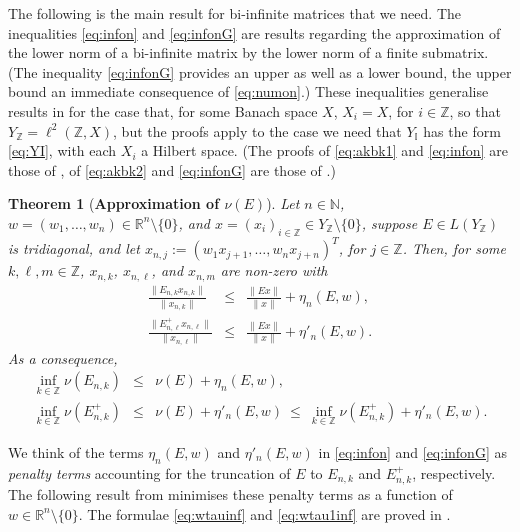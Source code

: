\documentclass[preprint,1p,11pt]{elsarticle}
\newcommand\N{{\mathbb N}}
\newcommand\I{{\mathbb I}}
\newcommand\R{{\mathbb R}}
\newcommand\Z{{\mathbb Z}}
\newtheorem{theorem}{Theorem}[section]
\numberwithin{equation}{section}   %
\numberwithin{figure}{section}  %
\begin{document}
The following is the main result for bi-infinite matrices that we need. The inequalities \eqref{eq:infon} and  \eqref{eq:infonG} are results regarding the approximation of the lower norm of a bi-infinite matrix by the lower norm of a finite submatrix. (The inequality \eqref{eq:infonG} provides an upper as well as a lower bound, the upper bound an immediate consequence of \eqref{eq:numon}.)  These inequalities generalise  results in   \cite{CW.Heng.ML:SpecIncl1} for the case that, for some Banach space $X$,  $X_i=X$, for $i\in \Z$, so that $Y_\Z=\ell^2(\Z,X)$, but the proofs apply to the case we need that $Y_\I$ has the form \eqref{eq:YI}, with each $X_i$ a Hilbert space. (The proofs of \eqref{eq:akbk1} and \eqref{eq:infon} are those of \cite[Prop.~3.3, Cor.~3.4]{CW.Heng.ML:SpecIncl1}, of \eqref{eq:akbk2} and \eqref{eq:infonG} are those of \cite[Prop.~5.1, Cor.~5.2]{CW.Heng.ML:SpecIncl1}.)



\begin{theorem}[{\bf Approximation of $\nu(E)$}] \label{cor:nubound}
Let $n\in\N$, $w=(w_1,\ldots,w_n)\in\R^n\setminus\{0\}$,   and  $x=(x_i)_{i\in \Z}\in Y_\Z\setminus\{0\}$, suppose $E\in L(Y_\Z)$ is tridiagonal, and let $x_{n,j} := (w_1 x_{j+1},\ldots, w_n x_{j+n})^T$, for $j\in \Z$. Then, for some $k,\ell,m\in \Z$, $x_{n,k}$, $x_{n,\ell}$, and $x_{n,m}$ are non-zero with
\begin{eqnarray} \label{eq:akbk1}
\frac{\|E_{n,k} x_{n,k}\|}{\|x_{n,k}\|} &\leq& \frac{\|Ex\|}{\|x\|}+\eta_{n}(E,w),\\  \label{eq:akbk2}
\frac{\|E^+_{n,\ell} x_{n,\ell}\|}{\|x_{n,\ell}\|} &\leq & \frac{\|Ex\|}{\|x\|}+\eta'_n(E,w).
\end{eqnarray}
As a consequence,
\begin{eqnarray} \label{eq:infon}
\inf_{k\in \Z} \nu(E_{n,k}) & \leq & \nu(E)+\eta_n(E,w),\\
 \label{eq:infonG}
\inf_{k\in \Z} \nu(E^+_{n,k}) & \leq & \nu(E)+\eta'_n(E,w)\ \leq\ \inf_{k\in \Z} \nu(E^+_{n,k}) +\eta'_n(E,w).
\end{eqnarray}
\end{theorem}

We think of the terms $\eta_n(E,w)$ and $\eta'_n(E,w)$ in \eqref{eq:infon} and \eqref{eq:infonG} as {\em penalty terms} accounting for the truncation of $E$ to $E_{n,k}$ and $E^+_{n,k}$, respectively. The following result from \cite{CW.Heng.ML:SpecIncl1} minimises these penalty terms as a function of  $w\in\R^n\setminus\{0\}$. The formulae \eqref{eq:wtauinf} and \eqref{eq:wtau1inf} are proved in  \cite[Corollaries 3.8 and 5.4]{CW.Heng.ML:SpecIncl1}. 
\end{document}
